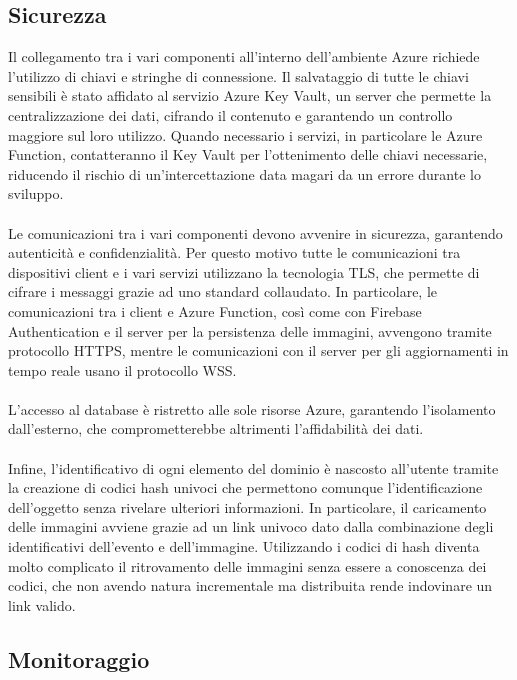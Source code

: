 \clearpage
\subsection{Sicurezza}

Il collegamento tra i vari componenti all’interno dell’ambiente Azure richiede l’utilizzo di chiavi e stringhe di connessione. 
Il salvataggio di tutte le chiavi sensibili è stato affidato al servizio Azure Key Vault,
 un server che permette la centralizzazione dei dati, cifrando il contenuto e garantendo un controllo maggiore sul loro utilizzo. 
Quando necessario i servizi, in particolare le Azure Function, contatteranno il Key Vault per l’ottenimento delle chiavi necessarie, 
riducendo il rischio di un’intercettazione data magari da un errore durante lo sviluppo.\\
\\
Le comunicazioni tra i vari componenti devono avvenire in sicurezza, garantendo autenticità e confidenzialità. 
Per questo motivo tutte le comunicazioni tra dispositivi client e i vari servizi utilizzano la tecnologia TLS, che permette di cifrare i messaggi grazie ad uno standard collaudato. 
In particolare, le comunicazioni tra i client e Azure Function, così come con Firebase Authentication e il server per la persistenza delle immagini, 
avvengono tramite protocollo HTTPS, mentre le comunicazioni con il server per gli aggiornamenti in tempo reale usano il protocollo WSS.\\
\\
L’accesso al database è ristretto alle sole risorse Azure, garantendo l’isolamento dall’esterno, che comprometterebbe altrimenti l’affidabilità dei dati.\\
\\
Infine, l’identificativo di ogni elemento del dominio è nascosto all’utente tramite la creazione di codici hash univoci 
che permettono comunque l’identificazione dell’oggetto senza rivelare ulteriori informazioni. 
In particolare, il caricamento delle immagini avviene grazie ad un link univoco dato dalla combinazione degli identificativi dell’evento e dell’immagine. 
Utilizzando i codici di hash diventa molto complicato il ritrovamento delle immagini senza essere a conoscenza dei codici, 
che non avendo natura incrementale ma distribuita rende indovinare un link valido.

\clearpage
\subsection{Monitoraggio}

